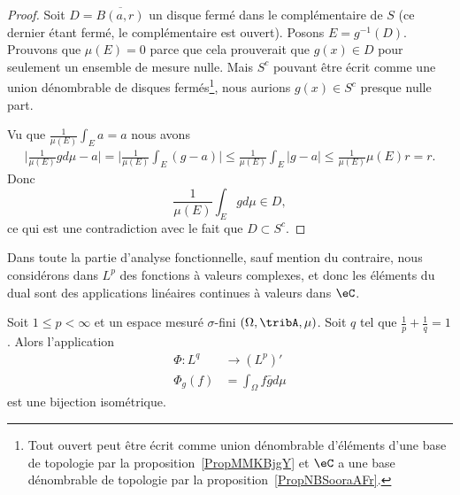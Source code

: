 \begin{proof}
    Soit \( D=\overline{ B(a,r) }\) un disque fermé dans le complémentaire de \( S\) (ce dernier étant fermé, le complémentaire est ouvert). Posons \( E=g^{-1}(D)\). Prouvons que \( \mu(E)=0\) parce que cela prouverait que \( g(x)\in D\) pour seulement un ensemble de mesure nulle. Mais \( S^c\) pouvant être écrit comme une union dénombrable de disques fermés\footnote{Tout ouvert peut être écrit comme union dénombrable d'éléments d'une base de topologie par la proposition~\ref{PropMMKBjgY} et $\eC$ a une base dénombrable de topologie par la proposition~\ref{PropNBSooraAFr}.}, nous aurions \( g(x)\in S^c\) presque nulle part.

    Vu que \( \frac{1}{ \mu(E) }\int_Ea=a\) nous avons
    \begin{subequations}
        \begin{align}
            \big| \frac{1}{ \mu(E) }gd\mu-a \big|=\big| \frac{1}{ \mu(E) }\int_E(g-a) \big|\leq  \frac{1}{ \mu(E) }\int_E| g-a |\leq\frac{1}{ \mu(E) }\mu(E)r=r.
        \end{align}
    \end{subequations}
    Donc
    \begin{equation}
        \frac{1}{ \mu(E) }\int_Egd\mu\in D,
    \end{equation}
    ce qui est une contradiction avec le fait que \( D\subset S^c\).
\end{proof}

Dans toute la partie d'analyse fonctionnelle, sauf mention du contraire, nous considérons dans \( L^p\) des fonctions à valeurs complexes, et donc les éléments du dual sont des applications linéaires continues à valeurs dans \( \eC\).

\begin{theorem}  \label{ThoLPQPooPWBXuv}
    Soit \( 1\leq p<\infty\) et un espace mesuré \( \sigma\)-fini \( (\Omega,\tribA,\mu)\). Soit \( q\) tel que \( \frac{1}{ p }+\frac{1}{ q }=1\). Alors l'application
    \begin{equation}
        \begin{aligned}
            \Phi\colon L^q&\to (L^p)' \\
            \Phi_g(f)&=\int_{\Omega}f\bar gd\mu
        \end{aligned}
    \end{equation}
    est une bijection isométrique.
\end{theorem}

